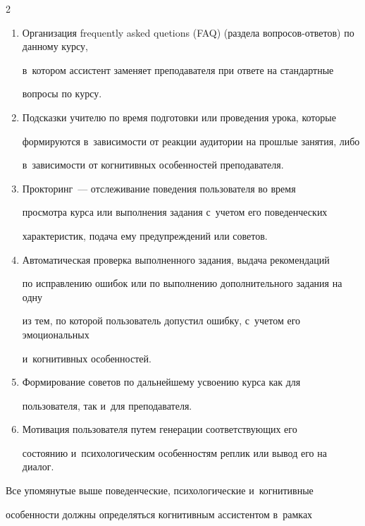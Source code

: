 \begin{multicols}{2}
\begin{enumerate}[1.]
словами, адаптация программы обучения по выбранной пользователем теме 


в~зависимости от когнитивных особенностей этого пользователя.


\item Организация frequently asked quetions (FAQ) (раздела во\-про\-сов-от\-ве\-тов) по данному курсу, 


в~котором ассистент заменяет преподавателя при ответе на стандартные 


вопросы по курсу.


\item Подсказки учителю по время подготовки или проведения урока, которые 


формируются в~зависимости от реакции аудитории на прошлые занятия, либо 


в~зависимости от когнитивных особенностей преподавателя.


\item Прокторинг~--- отслеживание поведения пользователя во время 


просмотра курса или выполнения задания с~учетом его поведенческих 


характеристик, подача ему предупреждений или советов.


\item Автоматическая проверка выполненного задания, выдача рекомендаций 


по исправлению ошибок или по выполнению дополнительного задания на одну 


из тем, по которой пользователь допустил ошибку, с~учетом его эмоциональных 


и~когнитивных особенностей.


\item Формирование советов по дальнейшему усвоению курса как для 


пользователя, так и~для преподавателя.


\item Мотивация пользователя путем генерации соответствующих его 


состоянию и~психологическим особенностям реплик или вывод его на диалог.


\end{enumerate}





  Все упомянутые выше поведенческие, психологические и~когнитивные 


особенности должны определяться когнитивным ассистентом в~рамках 



\end{multicols}

